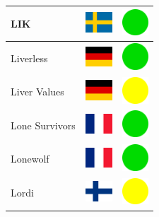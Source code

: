 \documentclass[12pt, a4paper, twoside]{report}
\begin{document}
\begin{center}
\begin{longtable}{|p{5cm}|p{2cm}|p{2cm}|}
 LIK                                                        & \includegraphics[width=1cm]{../img/flags/se} &   \includegraphics[width=1cm]{../likes/y} \\ \hline
 Liverless                                                  & \includegraphics[width=1cm]{../img/flags/de} &   \includegraphics[width=1cm]{../likes/y} \\ \hline
 Liver Values                                               & \includegraphics[width=1cm]{../img/flags/de} &   \includegraphics[width=1cm]{../likes/m} \\ \hline
 Lone Survivors                                             & \includegraphics[width=1cm]{../img/flags/fr} &   \includegraphics[width=1cm]{../likes/y} \\ \hline
 Lonewolf                                                   & \includegraphics[width=1cm]{../img/flags/fr} &   \includegraphics[width=1cm]{../likes/y} \\ \hline
 Lordi                                                      & \includegraphics[width=1cm]{../img/flags/fi} &   \includegraphics[width=1cm]{../likes/m} \\ \hline

\end{longtable}
\end{center}
\end{document}
